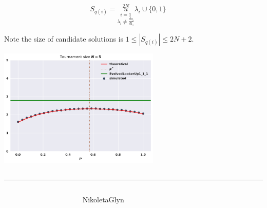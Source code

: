 \documentclass[usenames,dvipsnames,t]{beamer}
\begin{document}
\begin{columns}
\begin{column}{.45\linewidth}
            \[ S_{q(i)} =  \overset{2N}{\underset{\lambda_i \neq \frac{do_i}{d1_i}}{\underset{i=1}{u}}} \lambda_i \cup \{0, 1\} \]
            \vspace{0.3cm}

            Note the size of candidate solutions is \( 1 \leq|S_{q(i)}| \leq 2N + 2\).
            \vspace{0.3cm}

            \begin{center}
                \includegraphics[width=0.6\textwidth]{static/random_vs_multiple}
            \end{center}
            \vspace{0.3cm}
    \end{column}
    \begin{column}{.05\linewidth}
    \end{column}
\end{columns}
\hrule height 5pt 
\begin{columns}
    \begin{column}{.05\linewidth}
    \end{column}
    \begin{column}{.20\linewidth}
        \vspace{0.7cm}

        \faTwitter \ NikoletaGlyn
    \end{column}
    \begin{column}{.20\linewidth}
        \vspace{0.7cm}

        \faGithub \ Nikoleta-v3}
    \end{column}
    \begin{column}{.55\linewidth}
    \end{column}
\end{columns}
\end{document}
